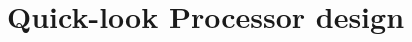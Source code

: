 \documentclass[class=report,11pt,crop=false]{standalone}
\begin{document}
\ifstandalone
\tableofcontents
\fi
\chapter{Quick-look Processor design \label{ch:QLPdesign}}



 
\end{document}
